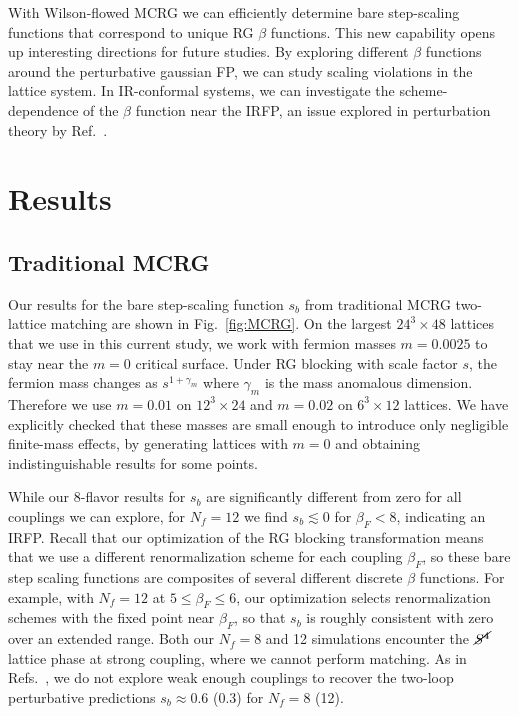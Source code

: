 \documentclass{PoS}
\newcommand{\be}{\ensuremath{\beta} }
\newcommand{\ga}{\ensuremath{\gamma} }
\newcommand{\lsim}{\ensuremath{\lesssim} }
\newcommand{\X}{\ensuremath{\!\times\!} }
\newcommand{\Sb}{\ensuremath{\cancel{S^4}} }
\newcommand{\refcite}[1]{Ref.~\cite{#1}}
\newcommand{\fig}[1]{Fig.~\ref{#1}}
\begin{document}
With Wilson-flowed MCRG we can efficiently determine bare step-scaling functions that correspond to unique RG \be functions.
This new capability opens up interesting directions for future studies.
By exploring different \be functions around the perturbative gaussian FP, we can study scaling violations in the lattice system.
In IR-conformal systems, we can investigate the scheme-dependence of the \be function near the IRFP, an issue explored in perturbation theory by \refcite{Ryttov:2012nt}.



\section{Results} %
\subsection{\label{sec:MCRGresults}Traditional MCRG} %
Our results for the bare step-scaling function $s_b$ from traditional MCRG two-lattice matching are shown in \fig{fig:MCRG}.
On the largest $24^3\X48$ lattices that we use in this current study, we work with fermion masses $m = 0.0025$ to stay near the $m = 0$ critical surface.
Under RG blocking with scale factor $s$, the fermion mass changes as $s^{1 + \ga_m}$ where $\ga_m$ is the mass anomalous dimension.
Therefore we use $m = 0.01$ on $12^3\X24$ and $m = 0.02$ on $6^3\X12$ lattices.
We have explicitly checked that these masses are small enough to introduce only negligible finite-mass effects, by generating lattices with $m = 0$ and obtaining indistinguishable results for some points.

While our 8-flavor results for $s_b$ are significantly different from zero for all couplings we can explore, for $N_f = 12$ we find $s_b \lsim 0$ for $\be_F < 8$, indicating an IRFP.
Recall that our optimization of the RG blocking transformation means that we use a different renormalization scheme for each coupling $\be_F$, so these bare step scaling functions are composites of several different discrete \be functions.
For example, with $N_f = 12$ at $5 \leq \be_F \leq 6$, our optimization selects renormalization schemes with the fixed point near $\be_F$, so that $s_b$ is roughly consistent with zero over an extended range.
Both our $N_f = 8$ and 12 simulations encounter the \Sb lattice phase at strong coupling, where we cannot perform matching.
As in Refs.~\cite{Hasenfratz:2011xn, Hasenfratz:2011np}, we do not explore weak enough couplings to recover the two-loop perturbative predictions $s_b \approx 0.6$ (0.3) for $N_f = 8$ (12).
\end{document}
